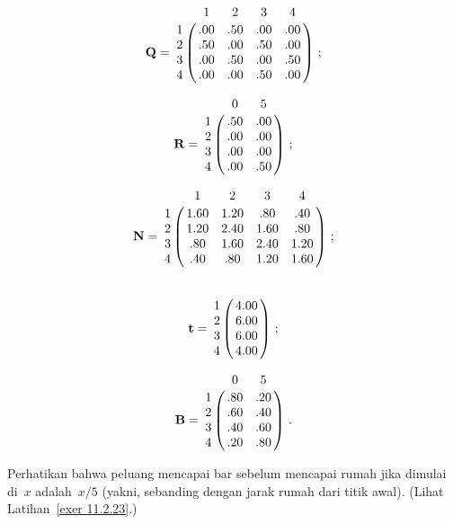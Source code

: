 $$
\mat{Q}  = \bordermatrix{
  & 1     & 2     & 3     & 4  \cr
1 & .00   & .50   & .00   & .00\cr
2 & .50   & .00   & .50   & .00\cr
3 & .00   & .50   & .00   & .50\cr 
4 & .00   & .00   & .50   & .00}\ ;
$$

$$
\mat{R}  = \bordermatrix{
  & 0     & 5     \cr
1 & .50   & .00   \cr
2 & .00   & .00   \cr
3 & .00   & .00   \cr 
4 & .00   & .50   }\ ;
$$

$$
\mat{N}  = \bordermatrix{
  & 1      & 2      & 3      &  4  \cr
1 & 1.60   & 1.20   & .80    & .40 \cr
2 & 1.20   & 2.40   & 1.60   & .80 \cr
3 & .80    & 1.60   & 2.40   & 1.20\cr 
4 & .40    & .80    & 1.20   & 1.60}\ ;
$$

$$
\mat{t}  = \bordermatrix{
 &  \cr
1  & 4.00 \cr
2  & 6.00 \cr
3  & 6.00 \cr
4  & 4.00}\ ;
$$

$$
\mat{B}  = \bordermatrix{
  & 0     & 5     \cr
1 & .80   & .20   \cr
2 & .60   & .40   \cr
3 & .40   & .60   \cr 
4 & .20   & .80   }\ .
$$
 
Perhatikan bahwa peluang mencapai bar sebelum mencapai rumah jika dimulai
di~$x$ adalah~$x/5$ (yakni, sebanding dengan jarak rumah dari titik awal).
(Lihat Latihan~\ref{exer 11.2.23}.)

